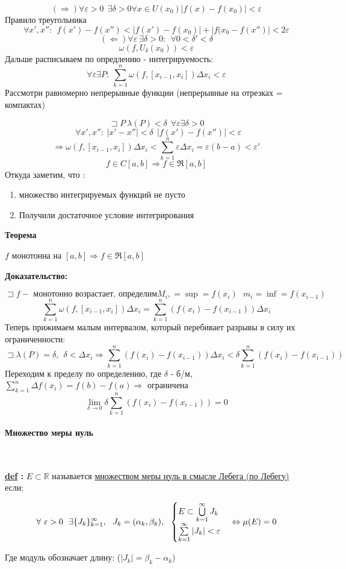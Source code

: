 \documentclass[a4paper,11pt]{article}
\renewcommand{\epsilon}{\ensuremath{\varepsilon}}
\newcommand{\Def}[1]{ 
\noindent\makebox[\linewidth]{\rule{\textwidth}{1pt}} 

 \noindent \textbf{\underline{def} :}
#1 

\noindent\makebox[\linewidth]{\rule{\textwidth}{1pt}} }
\newcommand{\R}{\mathbb{R}}
\newcommand{\Let}{\sqsupset}
\newcommand{\Theorem}[3]{ 
\noindent\makebox[\linewidth]{\rule{\textwidth}{2pt}}

\noindent \textbf{#1} 
 
 #2
 
 \noindent\makebox[\linewidth]{\rule{\textwidth}{2pt}}
 \noindent \textbf{Доказательство:}
 
 #3
 
 \noindent\makebox[\linewidth]{\rule{\textwidth}{2pt}}
 }
\newcommand{\formula}[1]{
\begin{myquote} 
	\centering
	\begin{equation}
	{#1}
	\end{equation}
\end{myquote}
 }
\newcommand{\Sum}{\sum\limits_{k = 1}^n}
\newcommand{\foralle}{\forall \ \epsilon > 0 \ \ }
\begin{document}
\[
(\Rightarrow) \forall \epsilon > 0 \ \ \exists \delta > 0 \forall x \in U(x_0) |f(x) - f(x_0)| < \epsilon
\]
Правило треугольника 
\[
\forall x',x'' :  \ \ f(x') - f(x'') < |f(x')- f(x_0)| + |f(x_0 - f(x'')|< 2 \epsilon
\]
\[
(\Leftarrow) \forall \epsilon \ \exists \delta > 0 : \ \ \forall 0< \delta' < \delta
\]
\[
\omega(f, U_{\delta}(x_0)) < \epsilon 
\]
Дальше расписываем по опредлению - ннтегрируемость:
\[
\forall \epsilon \exists P: \ \Sum \omega(f, [x_{i-1},x_{i}] )\Delta x_i < \epsilon
\]
Рассмотри равномерно непрерывные функции (непрерывные на отрезках = компактах)

\[
\Let P  \ \lambda(P) < \delta \ \ \forall \epsilon \exists \delta>0\] \[ \ \ \forall x', x'': \ |x'- x''| < \delta \ \ |f(x') - f(x'')| < \epsilon
\]
\[
 \Rightarrow \omega(f, [x_{i-1},x_i]) \Delta x_i < \Sum \epsilon \Delta x_i = \epsilon (b - a) < \epsilon'
\]
\[
 f \in C[a, b] \Rightarrow f \in \Re[a, b]
\]
Откуда заметим, что :
\begin{enumerate}
\item множество интегрируемых функций не пусто 
\item Получили достаточное условие интегрирования
\end{enumerate}



\Theorem{Теорема}{\label{Th:intmonotone}
	$f $ монотонна на $[a, b] \Rightarrow f \in \Re[a, b]$}
{
\[
\Let f - \text{ монотонно возрастает, определим} M_i,= \sup = f(x_{i}) \ \  \ m_i = \inf = f(x_{i-1})
\]
\[
\Sum \omega(f, [x_{i-1}, x_i]) \Delta x_i = \Sum ( f(x_i) - f(x_{i-1})) \Delta x_i
\]
Теперь прижимаем малым интервалом, который перебивает разрывы в силу их ограниченности:
\[
\Let \lambda (P) = \delta, \ \ \delta < \Delta x_i \Rightarrow \Sum ( f(x_i) - f(x_{i-1})) \Delta x_i < \delta \Sum (f(x_i) - f(x_{i-1}))
\]
Переходим к пределу по определению, где $\delta$ - б/м, $\Sum \Delta f(x_i) = f(b) - f(a) \Rightarrow$ ограничена
\[
\lim\limits_{\delta \to 0} \delta \Sum (f(x_i) - f(x_{i-1})) = 0
\]
}
\paragraph{Множество меры нуль}
\

\Def{\label{def:zero}
$E \subset \R $ называется \underline{множеством меры нуль в смысле Лебега (по Лебегу)} если:
 \formula{
 	\label{eq:zero}
\foralle \exists \{ J_k\}^{\infty}_{k=1}, \ \ J_k = (\alpha_k, \beta_k), \ \
\begin{cases}
 E \subset \bigcup\limits_{k=1}^{\infty} J_k \\
 \sum\limits_{k=1}^{\infty} |J_k| < \epsilon
\end{cases}
	\Leftrightarrow \mu(E) = 0
}
Где модуль обозначает длину: ($|J_k| = \beta_k - \alpha_k$)
}
\end{document}
